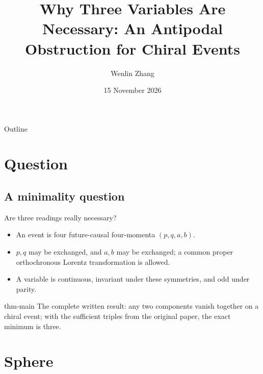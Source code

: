 \documentclass{beamer}
\title{Why Three Variables Are Necessary: An Antipodal Obstruction for Chiral Events}
\author{Wenlin Zhang}
\institute{National University of Singapore and Chrono AI, Singapore}
\date{15 November 2026}
\begin{document}
\begin{frame}
  \titlepage
\end{frame}
\begin{frame}{Outline}
  \tableofcontents
\end{frame}
\section{Question}
\subsection{A minimality question}
\begin{frame}{Are three readings really necessary?}
  \begin{itemize}
    \item An event is four future-causal four-momenta $(p,q,a,b)$.
    \item $p,q$ may be exchanged, and $a,b$ may be exchanged; a common proper orthochronous Lorentz transformation is allowed.
    \item A variable is continuous, invariant under these symmetries, and odd under parity.
  \end{itemize}
  \begin{bookresult}{thm-main}
    The complete written result: any two components vanish together on a chiral event; with the sufficient triples from the original paper, the exact minimum is three.
  \end{bookresult}
\end{frame}
\section{Sphere}
\end{document}

